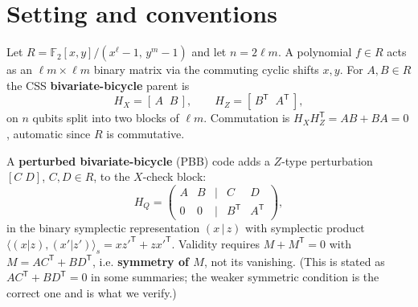 \documentclass[11pt]{article}
\theoremstyle{plain}
\theoremstyle{remark}
\begin{document}
\begin{abstract}
The bound is not merely valid but \emph{exact}.  A second elementary identity --- the
dressing space is the image of the left kernel of $[A\;B]$, whose dimension is
$k_P/2$ on every BB parent --- caps $\dim\bar\Delta\le k_P/2$.  Whenever
$T(P)\ge k_P/2$, which holds on $133$ of the $134$ certified parents, the two
bounds \textbf{sandwich}:
\[
\boxed{\;d_Q > d_Z(P)\ \text{and}\ T(P)\ge k_P/2\quad\Longrightarrow\quad
k_Q = k_P - T(P)\ \text{exactly}\;}
\]
Perturbation does not just pay at least $T$ logical qubits for distance; on
every parent in the theorem's class it pays \emph{precisely} $T$, no more and no
less.  All $7$ independently certified distance-increasing perturbations sit on
the law exactly (slack $0$, hypotheses replay-certified), and a controlled
small-lattice probe --- $64$ sampled parents across four lattices, $26{,}898$
valid $\delta>0$ perturbations of $Z$-support $\le 4$, distances decided by
exact symplectic meet-in-the-middle --- found $496$ further
strict increases, \textbf{every one on the law, zero above it}: instances we now
know were theorem-forced rather than lucky.
\end{abstract}

\section{Setting and conventions}\label{sec:conventions}

Let $R=\mathbb{F}_2[x,y]/(x^{\ell}-1,\,y^{m}-1)$ and let $n=2\ell m$. A polynomial
$f\in R$ acts as an $\ell m\times \ell m$ binary matrix via the commuting cyclic shifts
$x,y$. For $A,B\in R$ the CSS \textbf{bivariate-bicycle} parent is
\[
H_X=[\,A\;\;B\,],\qquad H_Z=[\,B^{\mathsf T}\;\;A^{\mathsf T}\,],
\]
on $n$ qubits split into two blocks of $\ell m$. Commutation is
$H_XH_Z^{\mathsf T}=AB+BA=0$, automatic since $R$ is commutative.

A \textbf{perturbed bivariate-bicycle} (PBB) code adds a $Z$-type perturbation $[C\;D]$,
$C,D\in R$, to the $X$-check block:
\[
H_Q=\begin{pmatrix} A & B & \big| & C & D\\[2pt] 0 & 0 & \big| & B^{\mathsf T} & A^{\mathsf T}\end{pmatrix},
\]
in the binary symplectic representation $(x\,|\,z)$ with symplectic product
$\langle (x|z),(x'|z')\rangle_s = xz'^{\mathsf T}+zx'^{\mathsf T}$. Validity requires
$M+M^{\mathsf T}=0$ with $M=AC^{\mathsf T}+BD^{\mathsf T}$, i.e. \textbf{symmetry of $M$}, not
its vanishing. (This is stated as $AC^{\mathsf T}+BD^{\mathsf T}=0$ in some summaries; the
weaker symmetric condition is the correct one and is what we verify.)
\end{document}
